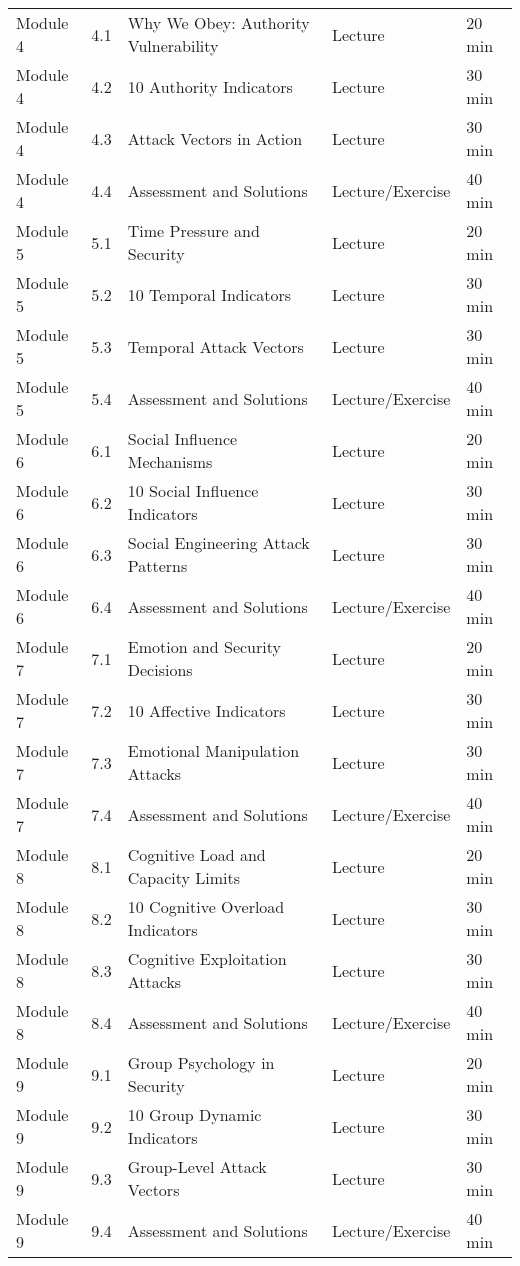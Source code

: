 \documentclass[11pt,a4paper]{article}
\begin{document}
\begin{longtable}{|p{2cm}|p{1cm}|p{7cm}|p{2cm}|p{1.5cm}|}
Module 4 & 4.1 & Why We Obey: Authority Vulnerability & Lecture & 20 min \\
Module 4 & 4.2 & 10 Authority Indicators & Lecture & 30 min \\
Module 4 & 4.3 & Attack Vectors in Action & Lecture & 30 min \\
Module 4 & 4.4 & Assessment and Solutions & Lecture/Exercise & 40 min \\
\hline

Module 5 & 5.1 & Time Pressure and Security & Lecture & 20 min \\
Module 5 & 5.2 & 10 Temporal Indicators & Lecture & 30 min \\
Module 5 & 5.3 & Temporal Attack Vectors & Lecture & 30 min \\
Module 5 & 5.4 & Assessment and Solutions & Lecture/Exercise & 40 min \\
\hline

Module 6 & 6.1 & Social Influence Mechanisms & Lecture & 20 min \\
Module 6 & 6.2 & 10 Social Influence Indicators & Lecture & 30 min \\
Module 6 & 6.3 & Social Engineering Attack Patterns & Lecture & 30 min \\
Module 6 & 6.4 & Assessment and Solutions & Lecture/Exercise & 40 min \\
\hline

Module 7 & 7.1 & Emotion and Security Decisions & Lecture & 20 min \\
Module 7 & 7.2 & 10 Affective Indicators & Lecture & 30 min \\
Module 7 & 7.3 & Emotional Manipulation Attacks & Lecture & 30 min \\
Module 7 & 7.4 & Assessment and Solutions & Lecture/Exercise & 40 min \\
\hline

Module 8 & 8.1 & Cognitive Load and Capacity Limits & Lecture & 20 min \\
Module 8 & 8.2 & 10 Cognitive Overload Indicators & Lecture & 30 min \\
Module 8 & 8.3 & Cognitive Exploitation Attacks & Lecture & 30 min \\
Module 8 & 8.4 & Assessment and Solutions & Lecture/Exercise & 40 min \\
\hline

Module 9 & 9.1 & Group Psychology in Security & Lecture & 20 min \\
Module 9 & 9.2 & 10 Group Dynamic Indicators & Lecture & 30 min \\
Module 9 & 9.3 & Group-Level Attack Vectors & Lecture & 30 min \\
Module 9 & 9.4 & Assessment and Solutions & Lecture/Exercise & 40 min \\
\hline


\end{longtable}
\end{document}
